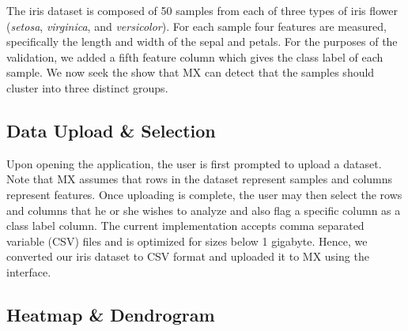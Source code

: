 \documentclass[12pt]{article}
\begin{document}
The iris dataset is composed of 50 samples from each of three types of iris flower (\textit{setosa}, \textit{virginica}, and \textit{versicolor}). For each sample four features are measured, specifically the length and width of the sepal and petals. For the purposes of the validation, we added a fifth feature column which gives the class label of each sample. We now seek the show that MX can detect that the samples should cluster into three distinct groups.

\subsection{Data Upload \& Selection}
\label{subsec:SubSecUpload}

Upon opening the application, the user is first prompted to upload a dataset. Note that MX assumes that rows in the dataset represent samples and columns represent features. Once uploading is complete, the user may then select the rows and columns that he or she wishes to analyze and also flag a specific column as a class label column. The current implementation accepts comma separated variable (CSV) files and is optimized for sizes below 1 gigabyte. Hence, we converted our iris dataset to CSV format and uploaded it to MX using the interface.

\subsection{Heatmap \& Dendrogram}
\label{subsec:SubSecHeatmap}
\end{document}
